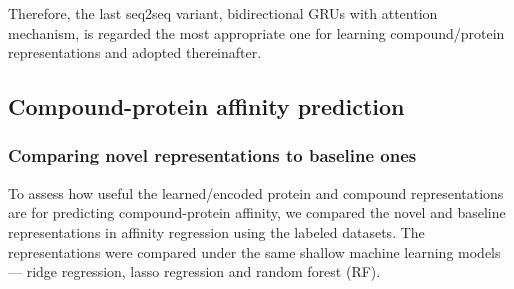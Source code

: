 \documentclass[nocrop]{bioinfo}
\begin{document}
Therefore, the last seq2seq variant,  bidirectional GRUs with attention mechanism, is regarded the most appropriate one for learning compound/protein representations and adopted thereinafter.

\vspace{-1em}
\subsection{Compound-protein affinity prediction}

\subsubsection{Comparing novel representations to baseline ones}

To assess how useful the learned/encoded protein and compound representations are for predicting compound-protein affinity, we compared the novel and baseline representations in affinity regression using the labeled datasets.  The representations were compared under the same shallow machine learning models --- ridge regression, lasso regression and random forest  (RF). 
\end{document}
